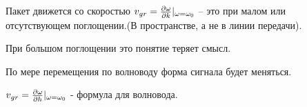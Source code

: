 \documentclass[a4paper,14pt]{extarticle}
\renewcommand{\kappa}{\varkappa}
\begin{document}
\begin{enumerate}
	
	
	Пакет движется со скоростью $ v_{gr} = \pdv{\omega}{k}\vert_{\omega = \omega_{0}} $ -- это при малом или отсутствующем поглощении.(В пространстве, а не в линии передачи).
	
	При большом поглощении это понятие теряет смысл.
	
	По мере перемещения по волноводу форма сигнала будет меняться.
	
	$v_{gr} = \pdv{\omega}{h}\vert_{\omega = \omega_{0}} $ - формула для волновода. 
	
%	
%	
%	
%	
%
%	
\end{enumerate}
\end{document}
